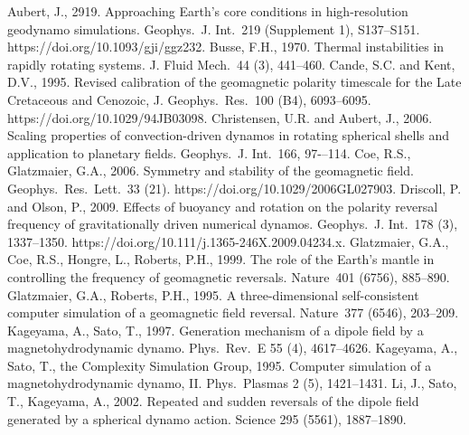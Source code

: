 \begin{thebibliography}{}
%
Aubert, J., 2919. Approaching Earth's core conditions in high-resolution geodynamo simulations. Geophys.\ J. Int.\ 219 (Supplement 1), S137--S151. https://doi.org/10.1093/gji/ggz232.
%
Busse, F.H., 1970. Thermal instabilities in rapidly rotating systems. J. Fluid Mech.\ 44 (3), 441--460.
%
Cande, S.C. and Kent, D.V., 1995. Revised calibration of the geomagnetic polarity timescale for the Late Cretaceous and Cenozoic, J. Geophys.\ Res.\ 100 (B4), 6093--6095. https://doi.org/10.1029/94JB03098.
%
Christensen, U.R. and Aubert, J., 2006. Scaling properties of convection-driven dynamos in rotating spherical shells and application to planetary fields. Geophys.\ J. Int.\ 166, 97-–114.
%   
Coe, R.S., Glatzmaier, G.A., 2006. Symmetry and stability of the geomagnetic field. Geophys.\ Res.\ Lett.\ 33 (21). https://doi.org/10.1029/2006GL027903.
%
Driscoll, P. and Olson, P., 2009. Effects of buoyancy and rotation on the polarity reversal frequency of gravitationally driven numerical dynamos. Geophys.\ J. Int.\ 178 (3), 1337--1350. https://doi.org/10.111/j.1365-246X.2009.04234.x.
%
Glatzmaier, G.A., Coe, R.S., Hongre, L., Roberts, P.H., 1999. The role of the Earth's mantle in controlling the frequency of geomagnetic reversals. Nature\ 401 (6756), 885--890.
%
Glatzmaier, G.A., Roberts, P.H., 1995. A three-dimensional self-consistent computer simulation of a geomagnetic field reversal. Nature\ 377 (6546), 203--209.
%
Kageyama, A., Sato, T., 1997. Generation mechanism of a dipole field by a magnetohydrodynamic dynamo. Phys.\ Rev.\ E 55 (4), 4617--4626.
%
Kageyama, A., Sato, T., the Complexity Simulation Group, 1995. Computer simulation of a magnetohydrodynamic dynamo, II. Phys.\ Plasmas 2 (5), 1421--1431.
%
Li, J., Sato, T., Kageyama, A., 2002. Repeated and sudden reversals of the dipole field generated by a spherical dynamo action. Science 295 (5561), 1887--1890.

\end{thebibliography}
